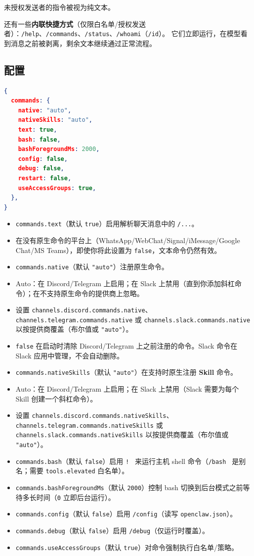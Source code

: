 未授权发送者的指令被视为纯文本。

还有一些\textbf{内联快捷方式}（仅限白名单/授权发送者）：\texttt{/help}、\texttt{/commands}、\texttt{/status}、\texttt{/whoami}（\texttt{/id}）。
它们立即运行，在模型看到消息之前被剥离，剩余文本继续通过正常流程。

\subsection{配置}


\begin{lstlisting}[language=json]
{
  commands: {
    native: "auto",
    nativeSkills: "auto",
    text: true,
    bash: false,
    bashForegroundMs: 2000,
    config: false,
    debug: false,
    restart: false,
    useAccessGroups: true,
  },
}
\end{lstlisting}


\begin{itemize}
  \item \texttt{commands.text}（默认 \texttt{true}）启用解析聊天消息中的 \texttt{/...}。
  \item 在没有原生命令的平台上（WhatsApp/WebChat/Signal/iMessage/Google Chat/MS Teams），即使你将此设置为 \texttt{false}，文本命令仍然有效。
  \item \texttt{commands.native}（默认 \texttt{"auto"}）注册原生命令。
  \item Auto：在 Discord/Telegram 上启用；在 Slack 上禁用（直到你添加斜杠命令）；在不支持原生命令的提供商上忽略。
  \item 设置 \texttt{channels.discord.commands.native}、\texttt{channels.telegram.commands.native} 或 \texttt{channels.slack.commands.native} 以按提供商覆盖（布尔值或 \texttt{"auto"}）。
  \item \texttt{false} 在启动时清除 Discord/Telegram 上之前注册的命令。Slack 命令在 Slack 应用中管理，不会自动删除。
  \item \texttt{commands.nativeSkills}（默认 \texttt{"auto"}）在支持时原生注册 \textbf{Skill} 命令。
  \item Auto：在 Discord/Telegram 上启用；在 Slack 上禁用（Slack 需要为每个 Skill 创建一个斜杠命令）。
  \item 设置 \texttt{channels.discord.commands.nativeSkills}、\texttt{channels.telegram.commands.nativeSkills} 或 \texttt{channels.slack.commands.nativeSkills} 以按提供商覆盖（布尔值或 \texttt{"auto"}）。
  \item \texttt{commands.bash}（默认 \texttt{false}）启用 \texttt{! } 来运行主机 shell 命令（\texttt{/bash } 是别名；需要 \texttt{tools.elevated} 白名单）。
  \item \texttt{commands.bashForegroundMs}（默认 \texttt{2000}）控制 bash 切换到后台模式之前等待多长时间（\texttt{0} 立即后台运行）。
  \item \texttt{commands.config}（默认 \texttt{false}）启用 \texttt{/config}（读写 \texttt{openclaw.json}）。
  \item \texttt{commands.debug}（默认 \texttt{false}）启用 \texttt{/debug}（仅运行时覆盖）。
  \item \texttt{commands.useAccessGroups}（默认 \texttt{true}）对命令强制执行白名单/策略。
\end{itemize}


